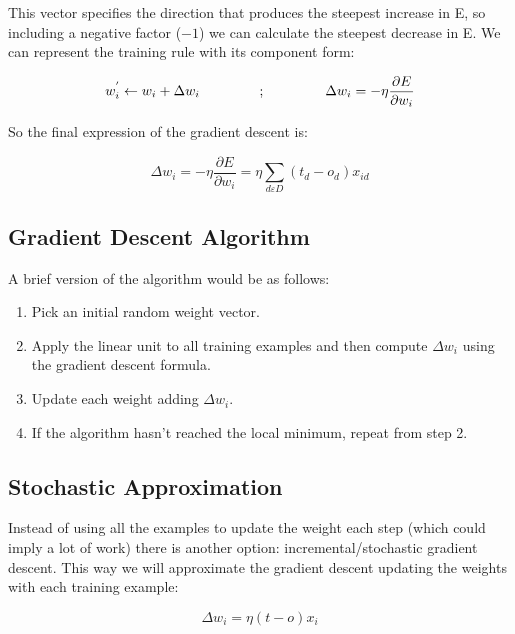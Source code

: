 	This vector specifies the direction that produces the steepest increase in E, so including a negative factor ($-1$) we can calculate the steepest decrease in E. We can represent the training rule with its component form:

	\begin{equation}
		\label{training_rule_component_form}
		w_{i}^{'} \leftarrow w_{i} + \Delta w_{i} \hspace{1.5cm} ; \hspace{1.5cm} \Delta{w_{i}}=-\eta \frac{\partial{E}}{\partial{w_i}}
	\end{equation}

	So the final expression of the gradient descent is:

	\begin{equation}
		\label{gradient_descent_final_expr}
		\Delta w_i = -\eta \frac{\partial{E}}{\partial{w_i}} = \eta \sum_{d \varepsilon D} (t_d - o_d) x_{id}
	\end{equation}


	\subsection{Gradient Descent Algorithm}
	A brief version of the algorithm would be as follows:

	\begin{enumerate}

		\item Pick an initial random weight vector.
		\item Apply the linear unit to all training examples and then compute $\Delta w_i$  using the gradient descent formula.
		\item Update each weight adding $\Delta w_i$.
		\item If the algorithm hasn’t reached the local minimum, repeat from step 2.
	
	\end{enumerate}

	\subsection{Stochastic Approximation}
	Instead of using all the examples to update the weight each step (which could imply a lot of work) there is another option: incremental/stochastic gradient descent. This way we will approximate the gradient descent updating the weights with each training example:

	\begin{equation}
		\label{delta_rule}
		\Delta w_{i}= \eta (t - o) x_{i}
	\end{equation}

